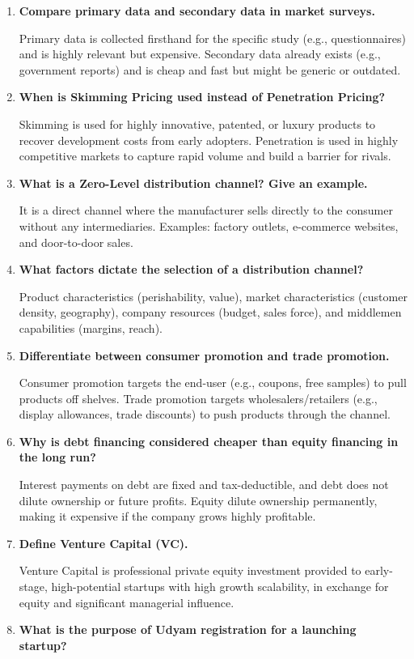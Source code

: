 \documentclass[12pt,a4paper]{article}
\newcommand{\Q}[1]{\textbf{#1}\par\noindent\ignorespaces}
\begin{document}
\begin{tcolorbox}[exambox, title={\textbf{Frequently Asked / Viva Questions}}]
\begin{enumerate}[topsep=0pt, label=\textbf{Q\arabic*.}, itemsep=5pt]
  \item \Q{Compare primary data and secondary data in market surveys.}
    Primary data is collected firsthand for the specific study (e.g., questionnaires) and is highly relevant but expensive. Secondary data already exists (e.g., government reports) and is cheap and fast but might be generic or outdated.
  \item \Q{When is Skimming Pricing used instead of Penetration Pricing?}
    Skimming is used for highly innovative, patented, or luxury products to recover development costs from early adopters. Penetration is used in highly competitive markets to capture rapid volume and build a barrier for rivals.
  \item \Q{What is a Zero-Level distribution channel? Give an example.}
    It is a direct channel where the manufacturer sells directly to the consumer without any intermediaries. Examples: factory outlets, e-commerce websites, and door-to-door sales.
  \item \Q{What factors dictate the selection of a distribution channel?}
    Product characteristics (perishability, value), market characteristics (customer density, geography), company resources (budget, sales force), and middlemen capabilities (margins, reach).
  \item \Q{Differentiate between consumer promotion and trade promotion.}
    Consumer promotion targets the end-user (e.g., coupons, free samples) to pull products off shelves. Trade promotion targets wholesalers/retailers (e.g., display allowances, trade discounts) to push products through the channel.
  \item \Q{Why is debt financing considered cheaper than equity financing in the long run?}
    Interest payments on debt are fixed and tax-deductible, and debt does not dilute ownership or future profits. Equity dilute ownership permanently, making it expensive if the company grows highly profitable.
  \item \Q{Define Venture Capital (VC).}
    Venture Capital is professional private equity investment provided to early-stage, high-potential startups with high growth scalability, in exchange for equity and significant managerial influence.
  \item \Q{What is the purpose of Udyam registration for a launching startup?}

\end{enumerate}
\end{tcolorbox}
\end{document}
